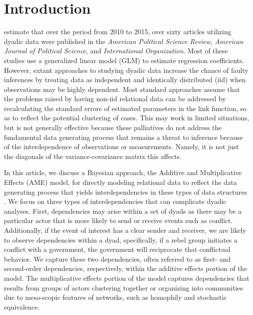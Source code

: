 \section{\textbf{Introduction}}

\citet{aronow:etal:2015} estimate that over the period from 2010 to 2015, over sixty articles utilizing dyadic data were published in the \textit{American Political Science Review}, \textit{American Journal of Political Science}, and \textit{International Organization}. Most of these studies use a generalized linear model (GLM) to estimate regression coefficients.  However, extant approaches to studying dyadic data increase the chance of faulty inferences by treating data as independent and identically distributed (iid) when observations may be highly dependent. Most standard approaches assume that the problems raised by having non-iid relational data can be addressed by recalculating the standard errors of estimated parameters in the link function, so as to reflect the potential clustering of cases. This may work in limited situations, but is not generally effective because these palliatives do not address the fundamental data generating process that remains a threat to inference because of the interdependence of observations or measurements. Namely, it is not just the diagonals of the variance-covariance matrix this affects.

In this article, we discuss a Bayesian approach, the Additive and Multiplicative Effects (AME) model, for directly modeling relational data to reflect the data generating process that yields interdependencies in these types of data structures \citep{hoff:2008,minhas:etal:2016:arxiv}. We focus on three types of interdependencies that can complicate dyadic analyses. First, dependencies may arise within a set of dyads as there may be a particular actor that is more likely to send or receive events such as conflict. Additionally, if the event of interest has a clear sender and receiver, we are likely to observe dependencies within a dyad, specifically, if a rebel group initiates a conflict with a government, the government will reciprocate that conflictual behavior. We capture these two dependencies, often referred to as first- and second-order dependencies, respectively, within the additive effects portion of the model. The multiplicative effects portion of the model captures dependencies that results from groups of actors clustering together or organizing into communities due to meso-scopic features of networks, such as homophily and stochastic equivalence. %

